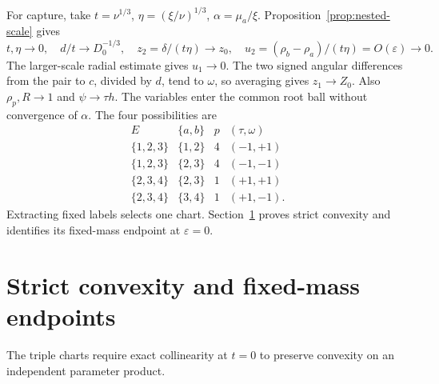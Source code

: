 \documentclass[11pt,a4paper]{article}
\numberwithin{equation}{section}
\theoremstyle{remark}
\newcommand{\eps}{\varepsilon}
\begin{document}
For capture, take $t=\nu^{1/3}$, $\eta=(\xi/\nu)^{1/3}$, $\alpha=\mu_a/\xi$. Proposition~\ref{prop:nested-scale} gives
\[
 t,\eta\to0,\quad d/t\to D_0^{-1/3},\quad
 z_2=\delta/(t\eta)\to z_0,\quad
 u_2=(\rho_b-\rho_a)/(t\eta)=O(\eps)\to0.
\]
The larger-scale radial estimate gives $u_1\to0$. The two signed angular differences from the pair to $c$, divided by $d$, tend to $\omega$, so averaging gives $z_1\to Z_0$. Also $\rho_p,R\to1$ and $\psi\to\tau h$. The variables enter the common root ball without convergence of $\alpha$. The four possibilities are
\[
\begin{array}{c|c|c|c}
E&\{a,b\}&p&(\tau,\omega)\\\hline
\{1,2,3\}&\{1,2\}&4&(-1,+1)\\
\{1,2,3\}&\{2,3\}&4&(-1,-1)\\
\{2,3,4\}&\{2,3\}&1&(+1,+1)\\
\{2,3,4\}&\{3,4\}&1&(+1,-1).
\end{array}
\]
Extracting fixed labels selects one chart. Section~\ref{sec:convexity} proves strict convexity and identifies its fixed-mass endpoint at $\eps=0$.

\section{Strict convexity and fixed-mass endpoints}
\label{sec:convexity}
The triple charts require exact collinearity at $t=0$ to preserve convexity on an independent parameter product.
\end{document}
